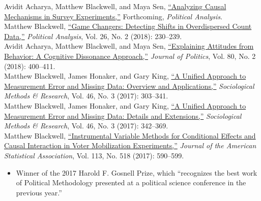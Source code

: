 \documentclass[margin,line,12pt]{res}
\begin{document}
\begin{resume}
Avidit Acharya, Matthew Blackwell, and Maya Sen, \href{http://www.mattblackwell.org/files/papers/survey-experiments.pdf}{``Analyzing Causal Mechanisms in Survey Experiments,''} Forthcoming, \emph{Political Analysis}.\vspace{1em}\\
Matthew Blackwell, \href{http://www.mattblackwell.org/files/papers/gamechangers-letter.pdf}{``Game Changers: Detecting Shifts in Overdispersed Count Data,''} \emph{Political Analysis}, Vol. 26, No. 2 (2018): 230--239.\vspace{1em}\\
Avidit Acharya, Matthew Blackwell, and Maya Sen, \href{http://www.mattblackwell.org/files/papers/attitudes.pdf}{``Explaining Attitudes from Behavior: A Cognitive Dissonance Approach,''} \emph{Journal of Politics}, Vol. 80, No. 2 (2018): 400--411.\vspace{1em}\\
Matthew Blackwell, James Honaker, and Gary King, \href{http://gking.harvard.edu/files/measure.pdf}{``A Unified Approach to Measurement Error and
Missing Data: Overview and Applications,''} \emph{Sociological Methods \& Research}, Vol. 46, No. 3 (2017): 303--341.\vspace{1em}\\
Matthew Blackwell, James Honaker, and Gary King, \href{http://gking.harvard.edu/files/measured.pdf}{``A Unified Approach to Measurement Error and
  Missing Data: Details and Extensions,''} \emph{Sociological Methods \& Research}, Vol. 46, No. 3 (2017): 342--369.\vspace{1em}\\
Matthew Blackwell, \href{http://www.mattblackwell.org/files/papers/joint-iv.pdf}{``Instrumental Variable Methods for Conditional Effects and Causal Interaction in Voter Mobilization Experiments,''} \emph{Journal of the American Statistical Association}, Vol. 113, No. 518 (2017): 590--599. 
\begin{itemize} 
\item Winner of the 2017 Harold F. Gosnell Prize, which ``recognizes the best work of Political Methodology presented at a political science conference in the previous year.''
\end{itemize}


\end{resume}
\end{document}
